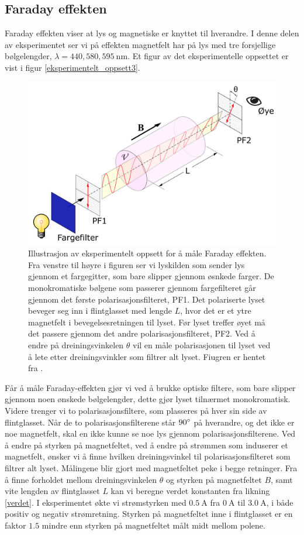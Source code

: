 \documentclass[%
 reprint,
 amsmath,amssymb,
 aps,
]{revtex4-1}
\begin{document}
\subsection{Faraday effekten}
Faraday effekten viser at lys og magnetiske er knyttet til hverandre. I denne delen av eksperimentet ser vi på effekten magnetfelt har på lys med tre forsjellige bølgelengder, $\lambda = 440, 580, \SI{595}{\nano\meter}$. Et figur av det eksperimentelle oppsettet er vist i figur \vref{eksperimentelt_oppsett3}.
\begin{figure}[h!]
  \centering
  \includegraphics[scale=0.3]{oppsett3.png}
  \caption{Illustrasjon av eksperimentelt oppsett for å måle Faraday effekten. Fra venstre til høyre i figuren ser vi lyskilden som sender lys gjennom et fargegitter, som bare slipper gjennom øsnkede farger. De monokromatiske bølgene som passerer gjennom fargefilteret går gjennom det første polarisasjonsfilteret, PF1. Det polariserte lyset beveger seg inn i flintglasset med lengde $L$, hvor det er et ytre magnetfelt i bevegelsesretningen til lyset. Før lyset treffer øyet må det passere gjennom det andre polarisasjonsfilteret, PF2. Ved å endre på dreiningsvinkelen $\theta$ vil en måle polarisasjonen til lyset ved å lete etter dreiningsvinkler som filtrer alt lyset.
  Fiugren er hentet fra \cite{oppgave}.}
  \label{eksperimentelt_oppsett3}
\end{figure}
Får å måle Faraday-effekten gjør vi ved å brukke optiske filtere, som bare slipper gjennom noen ønskede bølgelengder, dette gjør lyset tilnærmet monokromatisk. Videre trenger vi to polarisasjonsfiltere, som plasseres på hver sin side av flintglasset. Når de to polarisasjonsfilterene står $90\degree$ på hverandre, og det ikke er noe magnetfelt, skal en ikke kunne se noe lys gjennom polarisasjonsfilterene. Ved å endre på styrken på magnetfeltet, ved å endre på strømmen som induserer et magnetfelt, ønsker vi å finne hvilken dreiningsvinkel til polarisasjonsfilteret som filtrer alt lyset. Målingene blir gjort med magnetfeltet peke i begge retninger. Fra å finne forholdet mellom dreiningsvinkelen $\theta$ og styrken på magnetfeltet $B$, samt vite lengden av flintglasset $L$ kan vi beregne verdet konstanten fra likning \eqref{verdet}.
I eksperimentet økte vi strømstyrken med $\SI{0.5}{\ampere}$ fra $\SI{0}{\ampere}$ til $\SI{3.0}{\ampere}$, i både positiv og negativ strømretning. Styrken på magnetfeltet inne i flintglasset er en faktor $1.5$ mindre enn styrken på magnetfeltet målt midt mellom polene.
\end{document}
